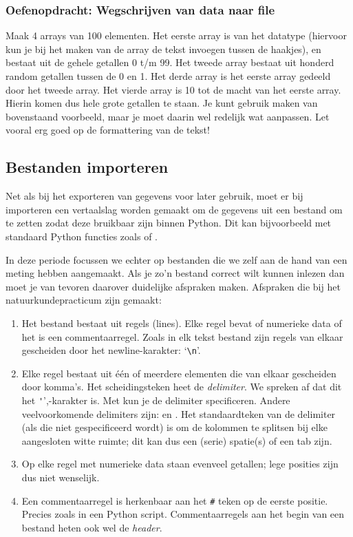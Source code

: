 \documentclass[a4paper,11pt, fleqn]{article}
\begin{document}
\subsubsection*{Oefenopdracht: Wegschrijven van data naar file}
Maak 4 arrays van 100 elementen. Het eerste array is van het datatype  (hiervoor kun je bij het maken van de array de tekst  invoegen tussen de haakjes), en bestaat uit de gehele getallen 0 t/m 99. Het tweede array bestaat uit honderd random getallen tussen de 0 en 1. Het derde array is het eerste array gedeeld door het tweede array. Het vierde array is 10 tot de macht van het eerste array. Hierin komen dus hele grote getallen te staan. Je kunt gebruik maken van bovenstaand voorbeeld, maar je moet daarin wel redelijk wat aanpassen. Let vooral erg goed op de formattering van de tekst!
\fi

\subsection{Bestanden importeren}
\label{Ch_Importeren}
Net als bij het exporteren van gegevens voor later gebruik, moet er bij importeren een vertaalslag worden gemaakt om de gegevens uit een bestand om te zetten zodat deze bruikbaar zijn binnen Python. Dit kan bijvoorbeeld met standaard Python functies zoals  of . 

In deze periode focussen we echter op bestanden die we zelf aan de hand van een meting hebben aangemaakt. Als je zo'n bestand correct wilt kunnen inlezen dan moet je van tevoren daarover duidelijke afspraken maken. Afspraken die bij het natuurkundepracticum zijn gemaakt:

\begin{enumerate}
\item Het bestand bestaat uit regels (lines). Elke regel bevat of numerieke data of het is een commentaarregel. Zoals in elk tekst bestand zijn regels van elkaar gescheiden door het newline-karakter: `\verb,\n,'.
\item Elke regel bestaat uit \'e\'en of meerdere elementen die van elkaar gescheiden door komma's. Het scheidingsteken heet de \textit{delimiter}. We spreken af dat dit het \verb,',',-karakter is. Met  kun je de delimiter specificeren. Andere veelvoorkomende delimiters zijn:  en . Het standaardteken van de delimiter (als die niet gespecificeerd wordt) is om de kolommen te splitsen bij elke aangesloten witte ruimte; dit kan dus een (serie) spatie(s) of een tab zijn.
\item Op elke regel met numerieke data staan evenveel getallen; lege posities zijn dus niet wenselijk.
\item Een commentaarregel is herkenbaar aan het \verb,#, teken op de eerste positie. Precies zoals in een Python script. Commentaarregels aan het begin van een bestand heten ook wel de {\it header}.
\end{enumerate}
\end{document}
